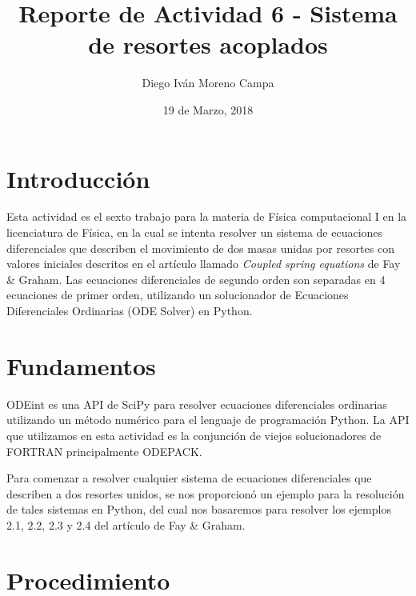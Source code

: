 \documentclass{article}
\title{Reporte de Actividad 6 - Sistema de resortes acoplados}
\author{Diego Iván Moreno Campa}
\date{19 de Marzo, 2018}
\begin{document}
\maketitle

\bigskip

\section{Introducción}

Esta actividad es el sexto trabajo para la materia de Física computacional I en la licenciatura de Física, en la cual se intenta resolver un sistema de ecuaciones diferenciales que describen el movimiento de dos masas unidas por resortes con valores iniciales descritos en el artículo llamado \textit{Coupled spring equations} de Fay \& Graham. Las ecuaciones diferenciales de segundo orden son separadas en 4 ecuaciones de primer orden, utilizando un solucionador de Ecuaciones Diferenciales Ordinarias (ODE Solver) en Python.

\section{Fundamentos}

ODEint es una API de SciPy para resolver ecuaciones diferenciales ordinarias utilizando un método numérico para el lenguaje de programación Python. La API que utilizamos en esta actividad es la conjunción de viejos solucionadores de FORTRAN principalmente ODEPACK.

Para comenzar a resolver cualquier sistema de ecuaciones diferenciales que describen a dos resortes unidos, se nos proporcionó un ejemplo para la resolución de tales sistemas en Python, del cual nos basaremos para resolver los ejemplos 2.1, 2.2, 2.3 y 2.4 del artículo de Fay \& Graham.

\newpage

\section{Procedimiento}
\end{document}

